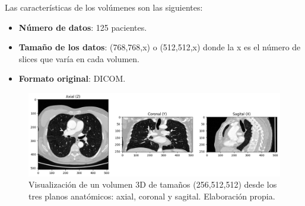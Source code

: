 Las características de los volúmenes son las siguientes:
\begin{itemize}
    \item \textbf{Número de datos}: 125 pacientes.
    \item \textbf{Tamaño de los datos}: (768,768,x) o (512,512,x) donde la x es el número de slices que varía en cada volumen. 
    \item \textbf{Formato original}: DICOM.
\end{itemize}


\begin{figure}[!htbp]
    \centering
    \includegraphics[width=1\textwidth]{img/ejemplos_planos256x512.png}
    \caption{Visualización de un volumen 3D de tamaños (256,512,512) desde los tres planos anatómicos: axial, coronal y sagital. Elaboración propia.}
    \label{fig:ejemplos_planos256x512-label}
\end{figure}

